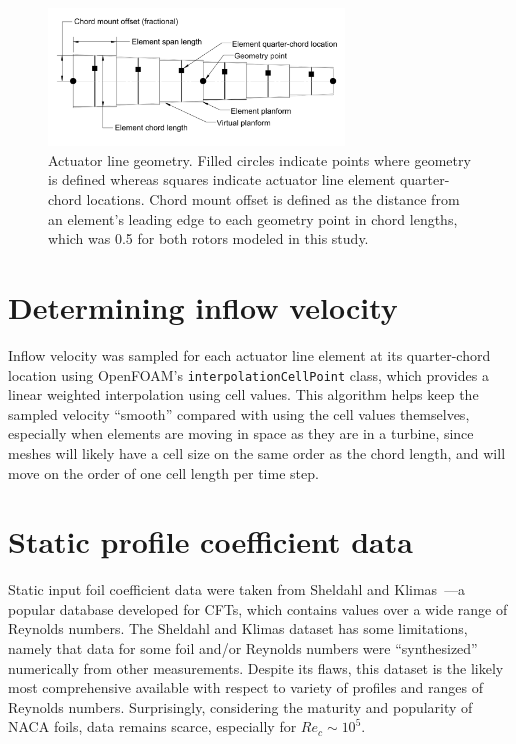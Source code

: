 \documentclass[times]{weauth}
\begin{document}
\begin{figure}
    \centering

    \includegraphics[width=0.7\textwidth]{thesis_alm-geometry}

    \caption{Actuator line geometry. Filled circles indicate points where
    geometry is defined whereas squares indicate actuator line element
    quarter-chord locations. Chord mount offset is defined as the distance from
    an element's leading edge to each geometry point in chord lengths, which was
    0.5 for both rotors modeled in this study.}

    \label{fig:AL-geom}
\end{figure}


\section{Determining inflow velocity}

Inflow velocity was sampled for each actuator line element at its quarter-chord
location using OpenFOAM's \texttt{interpolationCellPoint} class, which provides
a linear weighted interpolation using cell values. This algorithm helps keep the
sampled velocity ``smooth'' compared with using the cell values themselves,
especially when elements are moving in space as they are in a turbine, since
meshes will likely have a cell size on the same order as the chord length, and
will move on the order of one cell length per time step.


\section{Static profile coefficient data}

Static input foil coefficient data were taken from Sheldahl and
Klimas~\cite{Sheldahl1981}---a popular database developed for CFTs, which
contains values over a wide range of Reynolds numbers. The Sheldahl and Klimas
dataset has some limitations, namely that data for some foil and/or Reynolds
numbers were ``synthesized'' numerically from other measurements. Despite its
flaws, this dataset is the likely most comprehensive available with respect to
variety of profiles and ranges of Reynolds numbers. Surprisingly, considering
the maturity and popularity of NACA foils, data remains scarce, especially for
$Re_c \sim 10^5$.
\end{document}
